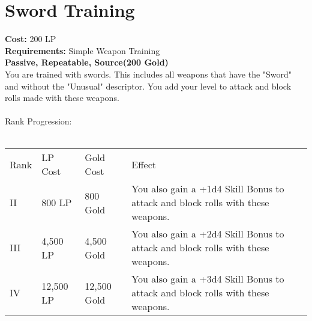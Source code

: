 \section{Sword Training}\label{perk:swordTraining}
\textbf{Cost:} 200 LP\\
\textbf{Requirements:} Simple Weapon Training\\
\textbf{Passive, Repeatable, Source(200 Gold)}\\
You are trained with swords.
This includes all weapons that have the "Sword" and without the "Unusual" descriptor.
You add your level to attack and block rolls made with these weapons.\\
\\
Rank Progression:\\
\\
\begin{longtable}{l | l | l | p{9cm}}
	Rank & LP Cost & Gold Cost & Effect\\
	II & 800 LP & 800 Gold & You also gain a +1d4 Skill Bonus to attack and block rolls with these weapons.\\
	III & 4,500 LP & 4,500 Gold & You also gain a +2d4 Skill Bonus to attack and block rolls with these weapons.\\
	IV & 12,500 LP & 12,500 Gold & You also gain a +3d4 Skill Bonus to attack and block rolls with these weapons.\\
\end{longtable}